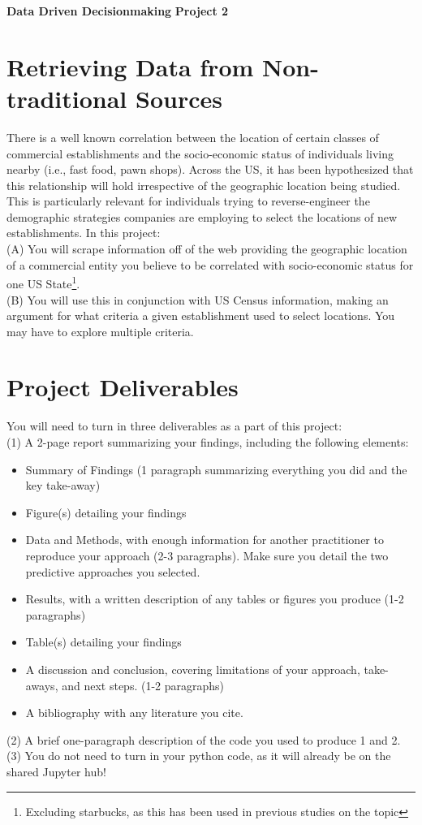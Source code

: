 \documentclass[a4paper, 11pt]{article}
\begin{document}
\noindent
\large\textbf{Data Driven Decisionmaking} \hfill \textbf{Project 2} \\

\section*{Retrieving Data from Non-traditional Sources}
There is a well known correlation between the location of certain classes of commercial establishments and the socio-economic status of individuals living nearby (i.e., fast food, pawn shops).  Across the US, it has been hypothesized that this relationship will hold irrespective of the geographic location being studied.  This is particularly relevant for individuals trying to reverse-engineer the demographic strategies companies are employing to select the locations of new establishments. In this project:\\
(A) You will scrape information off of the web providing the geographic location of a commercial entity you believe to be correlated with socio-economic status for one US State\footnote{Excluding starbucks, as this has been used in previous studies on the topic}.\\
(B) You will use this in conjunction with US Census information, making an argument for what criteria a given establishment used to select locations. You may have to explore multiple criteria.

\section{Project Deliverables}
You will need to turn in three deliverables as a part of this project:\\
(1) A 2-page report summarizing your findings, including the following elements:
\begin{itemize}
\item Summary of Findings (1 paragraph summarizing everything you did and the key take-away)
\item Figure(s) detailing your findings
\item Data and Methods, with enough information for another practitioner to reproduce your approach (2-3 paragraphs).  Make sure you detail the two predictive approaches you selected.
\item Results, with a written description of any tables or figures you produce (1-2 paragraphs)
\item Table(s) detailing your findings
\item A discussion and conclusion, covering limitations of your approach, take-aways, and next steps. (1-2 paragraphs)
\item A bibliography with any literature you cite.
\end{itemize}
(2) A brief one-paragraph description of the code you used to produce 1 and 2.\\
(3) You do not need to turn in your python code, as it will already be on the shared Jupyter hub!\\
\end{document}
